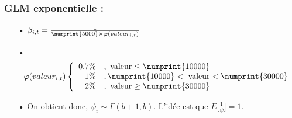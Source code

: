 \documentclass[11pt,french]{report}
\begin{document}
\subsubsection*{GLM exponentielle :}
\begin{itemize}
\item[•] $\beta _{i,t} = \frac{1}{\numprint{5000} \times \varphi(valeur_{i,t})}$
\item[•] \begin{align*}
\varphi(valeur_{i,t}) & \left\{
     \begin{array}{rl}
      0.7 \% &, \text{ valeur} \leq \numprint{10000} \\
      1 \% &, \numprint{10000}< \text{ valeur} < \numprint{30000}  \\
      2 \% &, \text{ valeur} \geq \numprint{30000} \\
     \end{array}
     \right. \\
\end{align*}
\item[•] On obtient donc, $\psi_i \sim \Gamma(b+1, b)$. L'idée est que $E\Bigg[\frac{1}{\psi} \Bigg] =1$.
\end{itemize}
\end{document}
